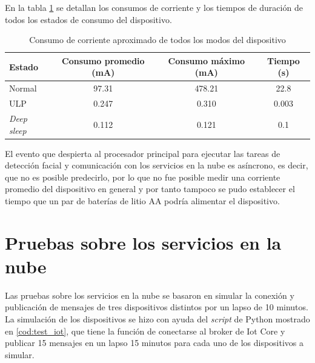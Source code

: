 En la tabla \ref{tab:test_ulp} se detallan los consumos de corriente y los tiempos de duración de todos los estados de consumo del dispositivo.

\begin{table}[h]
	\centering
	\caption[Consumo de corriente del dispositivo]{Consumo de corriente aproximado de todos los modos del dispositivo}
	\begin{tabular}{lccc}   
		\toprule
		\textbf{Estado} & \textbf{Consumo promedio (mA)} & \textbf{Consumo máximo (mA)} & \textbf{Tiempo (s)} \\
		\midrule
		Normal & 97.31 & 478.21 & 22.8 \\
		ULP & 0.247 & 0.310 & 0.003 \\
		\textit{Deep sleep} & 0.112 & 0.121 & 0.1 \\
		\bottomrule
		\hline
	\end{tabular}
	\label{tab:test_ulp}
\end{table}

El evento que despierta al procesador principal para ejecutar las tareas de detección facial y comunicación con los servicios en la nube es asíncrono, es decir, que no es posible predecirlo, por lo que no fue posible medir una corriente promedio del dispositivo en general y por tanto tampoco se pudo establecer el tiempo que un par de baterías de litio AA podría alimentar el dispositivo.

\section{Pruebas sobre los servicios en la nube}
Las pruebas sobre los servicios en la nube se basaron en simular la conexión y publicación de mensajes de tres dispositivos distintos por un lapso de 10 minutos. La simulación de los dispositivos se hizo con ayuda del \textit{script} de Python mostrado en \ref{cod:test_iot}, que tiene la función de conectarse al broker de Iot Core y publicar 15 mensajes en un lapso 15 minutos para cada uno de los dispositivos a simular.

